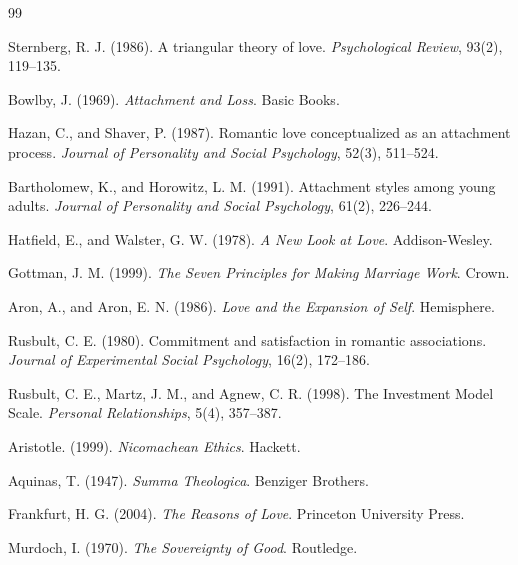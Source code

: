 \documentclass[11pt]{article}
\begin{document}
\begin{thebibliography}{99}

Sternberg, R. J. (1986).
\newblock A triangular theory of love.
\newblock \emph{Psychological Review}, 93(2), 119--135.

Bowlby, J. (1969).
\newblock \emph{Attachment and Loss}.
\newblock Basic Books.

Hazan, C., and Shaver, P. (1987).
\newblock Romantic love conceptualized as an attachment process.
\newblock \emph{Journal of Personality and Social Psychology}, 52(3), 511--524.

Bartholomew, K., and Horowitz, L. M. (1991).
\newblock Attachment styles among young adults.
\newblock \emph{Journal of Personality and Social Psychology}, 61(2), 226--244.

Hatfield, E., and Walster, G. W. (1978).
\newblock \emph{A New Look at Love}.
\newblock Addison-Wesley.

Gottman, J. M. (1999).
\newblock \emph{The Seven Principles for Making Marriage Work}.
\newblock Crown.

Aron, A., and Aron, E. N. (1986).
\newblock \emph{Love and the Expansion of Self}.
\newblock Hemisphere.

Rusbult, C. E. (1980).
\newblock Commitment and satisfaction in romantic associations.
\newblock \emph{Journal of Experimental Social Psychology}, 16(2), 172--186.

Rusbult, C. E., Martz, J. M., and Agnew, C. R. (1998).
\newblock The Investment Model Scale.
\newblock \emph{Personal Relationships}, 5(4), 357--387.

Aristotle. (1999).
\newblock \emph{Nicomachean Ethics}.
\newblock Hackett.

Aquinas, T. (1947).
\newblock \emph{Summa Theologica}.
\newblock Benziger Brothers.

Frankfurt, H. G. (2004).
\newblock \emph{The Reasons of Love}.
\newblock Princeton University Press.

Murdoch, I. (1970).
\newblock \emph{The Sovereignty of Good}.
\newblock Routledge.


\end{thebibliography}
\end{document}
